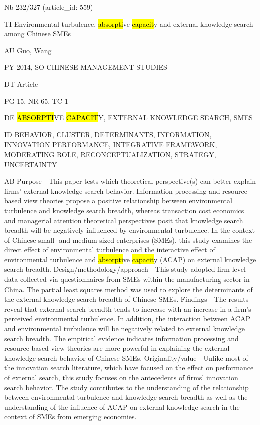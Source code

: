 \documentclass[a4paper]{article}
\begin{document}
\vspace*{-2cm}
Nb \tabto{0cm}232/327 (article\_id: 559)\par
TI \tabto{0cm}Environmental turbulence, \hl{absorpti}ve \hl{capacit}y and external knowledge search among Chinese SMEs\par
AU \tabto{0cm}Guo, Wang\par
PY \tabto{0cm}2014, SO CHINESE MANAGEMENT STUDIES\par
DT \tabto{0cm}Article\par
PG \tabto{0cm}15, NR 65, TC 1\par
DE \tabto{0cm}\hl{ABSORPTI}VE \hl{CAPACIT}Y, EXTERNAL KNOWLEDGE SEARCH, SMES\par
ID \tabto{0cm}BEHAVIOR, CLUSTER, DETERMINANTS, INFORMATION, INNOVATION PERFORMANCE, INTEGRATIVE FRAMEWORK, MODERATING ROLE, RECONCEPTUALIZATION, STRATEGY, UNCERTAINTY\par
AB \tabto{0cm}Purpose - This paper tests which theoretical perspective(s) can better explain firms' external knowledge search behavior. Information processing and resource-based view theories propose a positive relationship between environmental turbulence and knowledge search breadth, whereas transaction cost economics and managerial attention theoretical perspectives posit that knowledge search breadth will be negatively influenced by environmental turbulence. In the context of Chinese small- and medium-sized enterprises (SMEs), this study examines the direct effect of environmental turbulence and the interactive effect of environmental turbulence and \hl{absorpti}ve \hl{capacit}y (ACAP) on external knowledge search breadth.
Design/methodology/approach - This study adopted firm-level data collected via questionnaires from SMEs within the manufacturing sector in China. The partial least squares method was used to explore the determinants of the external knowledge search breadth of Chinese SMEs.
Findings - The results reveal that external search breadth tends to increase with an increase in a firm's perceived environmental turbulence. In addition, the interaction between ACAP and environmental turbulence will be negatively related to external knowledge search breadth. The empirical evidence indicates information processing and resource-based view theories are more powerful in explaining the external knowledge search behavior of Chinese SMEs.
Originality/value - Unlike most of the innovation search literature, which have focused on the effect on performance of external search, this study focuses on the antecedents of firms' innovation search behavior. The study contributes to the understanding of the relationship between environmental turbulence and knowledge search breadth as well as the understanding of the influence of ACAP on external knowledge search in the context of SMEs from emerging economies.\par
\clearpage
\end{document}

